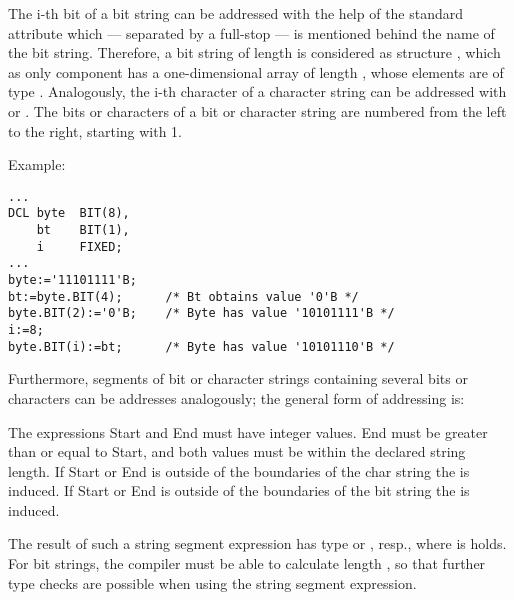 \begin{grammarframe}

\end{grammarframe}

The i-th bit of a bit string can be addressed with the help of the
standard attribute 
 which --- separated by a full-stop --- is mentioned
behind the name of the bit string. Therefore, a bit string  of length
 is considered as structure , which as only component has a
one-dimensional array  of length ,
 whose elements are of type
. Analogously, the i-th character of a character string 
 can be
addressed with  or .
 The bits or characters of a
bit or character string are numbered from the left to the right,
 starting with 1.

Example:

\begin{lstlisting}
... 
DCL byte  BIT(8),
    bt    BIT(1), 
    i     FIXED;  
... 
byte:='11101111'B; 
bt:=byte.BIT(4);      /* Bt obtains value '0'B */
byte.BIT(2):='0'B;    /* Byte has value '10101111'B */
i:=8; 
byte.BIT(i):=bt;      /* Byte has value '10101110'B */
\end{lstlisting}

Furthermore, segments of bit or character strings containing several
bits or characters can be addresses analogously; the general form of
addressing is:

\begin{grammarframe}

\end{grammarframe}


The expressions Start and End must have integer values. End must be
greater than or equal to Start, and both values must be within the
declared string length.
If Start or End is outside of the boundaries of  the char string
the  is induced.
If Start or End is outside of the boundaries of  the bit string
the  is induced.

The result of such a string segment expression has type  or
, resp., where  is holds. For bit
strings, the compiler must be able to calculate length , so that
further type checks are possible when using the string segment
expression.


